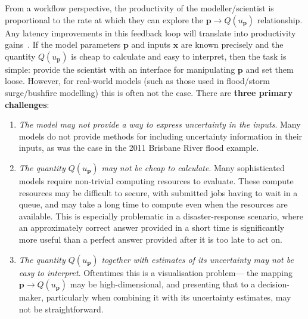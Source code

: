 \documentclass[a4paper,fontsize=12pt]{scrartcl}
\begin{document}
From a workflow perspective, the productivity of the
modeller/scientist is proportional to the rate at which they can
explore the $\mathbf{p} \rightarrow Q(u_{\mathbf{p}})$ relationship.
Any latency improvements in this feedback loop will translate into
productivity gains~\parencite{liu_effects_2014}. If the model
parameters $\mathbf{p}$ and inputs $\mathbf{x}$ are known precisely
and the quantity $Q(u_{\mathbf{p}})$ is cheap to calculate and easy to
interpret, then the task is simple: provide the scientist with an
interface for manipulating $\mathbf{p}$ and set them loose. However,
for real-world models (such as those used in flood/storm
surge/bushfire modelling) this is often not the case. There are
\textbf{three primary challenges}:
\begin{enumerate}
\item \emph{The model may not provide a way to express uncertainty in
    the inputs}. Many models do not provide methods for including
  uncertainty information in their inputs, as was the case in the 2011
  Brisbane River flood example.
\item \emph{The quantity $Q(u_{\mathbf{p}})$ may not be cheap to
    calculate}. Many
  sophisticated models require non-trivial computing resources to evaluate. These compute resources may be
  difficult to secure, with submitted jobs having to wait in a queue, and may
  take a long time to compute even when the resources are available.
  This is especially problematic in a disaster-response scenario,
  where an approximately correct answer provided in a short time is
  significantly more useful than a perfect answer provided after it is
  too late to act on.
\item \emph{The quantity $Q(u_{\mathbf{p}})$ together with estimates
    of its uncertainty may not be easy to interpret}. Oftentimes this
  is a visualisation problem--- the mapping
  $\mathbf{p} \rightarrow Q(u_{\mathbf{p}})$ may be high-dimensional,
  and presenting that to a decision-maker, particularly when combining
  it with its uncertainty estimates, may not be straightforward.
\end{enumerate}
\end{document}
